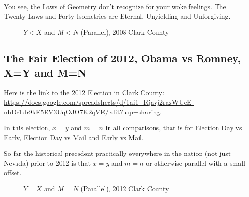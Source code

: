You see, the Laws of Geometry don't recognize for your woke feelings. The Twenty Laws and Forty Isometries are Eternal, Unyielding and Unforgiving.
\begin{figure}[bp!]
\begin{center}
\caption{$Y<X$ and $M<N$ (Parallel), 2008 Clark County}
\noindent{}
\end{center}
\end{figure}
\newpage
\subsection{The Fair Election of 2012, Obama vs Romney, X=Y and M=N}

Here is the link to the 2012 Election in Clark County: \url{https://docs.google.com/spreadsheets/d/1ai1_Rjavj2razWUeE-nbDr1dr9kE5EV3UqOJO7K2qVE/edit?usp=sharing}.

In this election, $x=y$ and $m=n$ in all comparisons, that is for Election Day vs Early, Election Day vs Mail and Early vs Mail.

So far the historical precedent practically everywhere in the nation (not just Nevada) prior to 2012 is that $x=y$ and $m=n$ or otherwise parallel with a small offset.
\begin{figure}[bp!]
\begin{center}
\caption{$Y=X$ and $M=N$ (Parallel), 2012 Clark County}
\noindent{}
\end{center}
\end{figure}
\newpage
